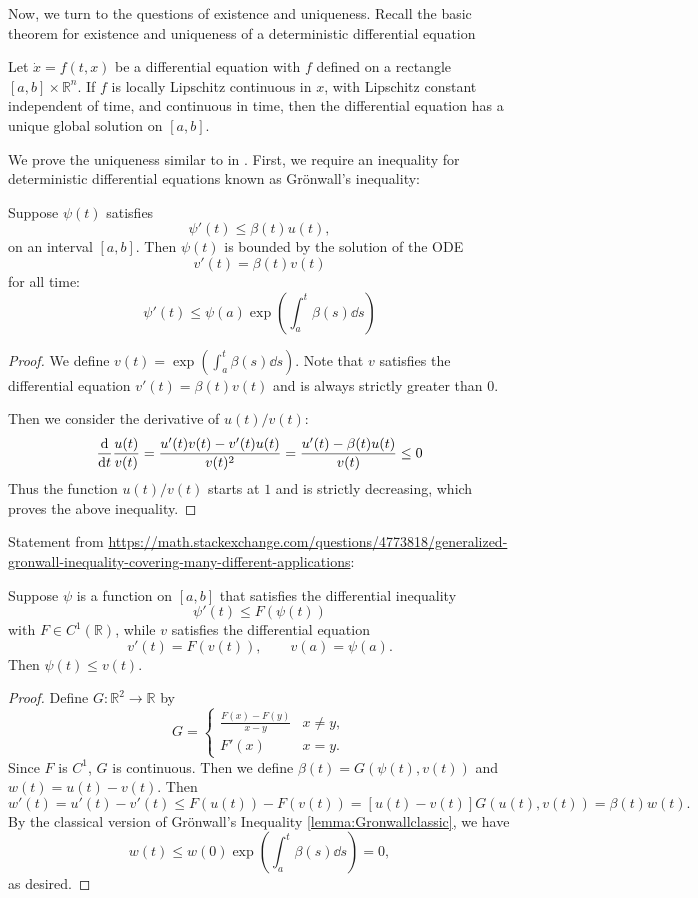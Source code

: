 \documentclass[prb,12pt]{revtex4-2}
\theoremstyle{definition}
\theoremstyle{definition}
\theoremstyle{definition}
\newcommand{\R}{\mathbb{R}}
\begin{document}
Now, we turn to the questions of existence and uniqueness. Recall the basic theorem for existence and uniqueness of a deterministic differential equation
\begin{Theorem}
	Let $\dot{x} = f(t,x)$ be a differential equation with $f$ defined on a rectangle $[a,b]\times \R^n$. If $f$ is locally Lipschitz continuous in $x$, with Lipschitz constant independent of time, and continuous in time, then the differential equation has a unique global solution on $[a,b]$.
\end{Theorem}
We prove the uniqueness similar to in \cite{rudin1976principles}. First, we require an inequality for deterministic differential equations known as Grönwall's inequality:
\begin{Lemma}\label{lemma:Gronwallclassic}
	Suppose $\psi(t)$ satisfies
	\[\psi'(t)\le \beta(t)u(t),\]
	on an interval $[a,b]$. Then $\psi(t)$ is bounded by the solution of the ODE
	\[v'(t)=\beta(t)v(t)\]
	for all time:
	\[\psi'(t)\le \psi(a)\exp\left(\int_a^t \beta(s)\dd{s}\right)\]
\end{Lemma}
\begin{proof}
	We define $v(t)=\exp\left(\int_a^t \beta(s)\dd{s}\right)$. Note that $v$ satisfies the differential equation $v'(t)=\beta(t)v(t)$ and is always strictly greater than $0$. 
	
	Then we consider the derivative of $u(t)/v(t)$:
	\[\dv{t}\frac{u(t)}{v(t)}=\frac{u'(t)v(t)-v'(t)u(t)}{v(t)^2}=\frac{u'(t)-\beta(t)u(t)}{v(t)}\le 0\]
	Thus the function $u(t)/v(t)$ starts at $1$ and is strictly decreasing, which proves the above inequality.
\end{proof}
\begin{Lemma}
	Statement from \url{https://math.stackexchange.com/questions/4773818/generalized-gronwall-inequality-covering-many-different-applications}:
	
	Suppose $\psi$ is a function on $[a,b]$ that satisfies the differential inequality
	\[\psi'(t)\le F(\psi(t))\]
	with $F\in C^1(\R)$, while $v$ satisfies the differential equation
	\[v'(t)=F(v(t)),\qquad v(a)=\psi(a).\]
	Then $\psi(t) \le v(t)$.
\end{Lemma}
\begin{proof}
	Define $G:\R^2 \to \R$ by
	\[G=\begin{cases}
		\frac{F(x)-F(y)}{x-y} & x\neq y,\\
		F'(x) & x=y.
	\end{cases}\]
	Since $F$ is $C^1$, $G$ is continuous. Then we define $\beta(t)=G(\psi(t), v(t))$ and $w(t)=u(t)-v(t)$. Then
	\[w'(t)=u'(t)-v'(t)\le F(u(t))-F(v(t))=[u(t)-v(t)]G(u(t),v(t))=\beta(t)w(t).\]
	By the classical version of Grönwall's Inequality \ref{lemma:Gronwallclassic}, we have
	\[w(t)\le w(0)\exp\left(\int_a^t \beta(s)\dd{s}\right)=0,\]
	as desired.
\end{proof}
\end{document}
